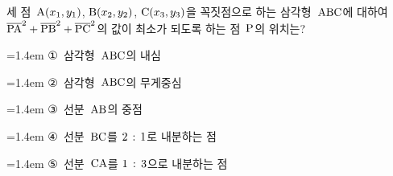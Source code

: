 세 점~$\mathrm{A}(x_1{,}\mkern3mu\mathopen{}y_1)$, $\mathrm{B}(x_2{,}\mkern3mu\mathopen{}y_2)$, $\mathrm{C}(x_3{,}\mkern3mu\mathopen{}y_3)$을 꼭짓점으로 하는 삼각형~$\mathrm{ABC}$에 대하여 $\overline{\mathrm{PA}}^2+\overline{\mathrm{PB}}^2+\overline{\mathrm{PC}}^2$의 값이 최소가 되도록 하는 점~$\mathrm{P}$의 위치는?
\par\medskip\par\noindent\hangindent=1.4em {\small ①}\ 삼각형~$\mathrm{ABC}$의 내심\par\noindent\hangindent=1.4em {\small ②}\ 삼각형~$\mathrm{ABC}$의 무게중심\par\noindent\hangindent=1.4em {\small ③}\ 선분~$\mathrm{AB}$의 중점\par\noindent\hangindent=1.4em {\small ④}\ 선분~$\mathrm{BC}$를 $2\mkern3mu :\mkern3mu 1$로 내분하는 점\par\noindent\hangindent=1.4em {\small ⑤}\ 선분~$\mathrm{CA}$를 $1\mkern3mu :\mkern3mu 3$으로 내분하는 점\par\medskip

